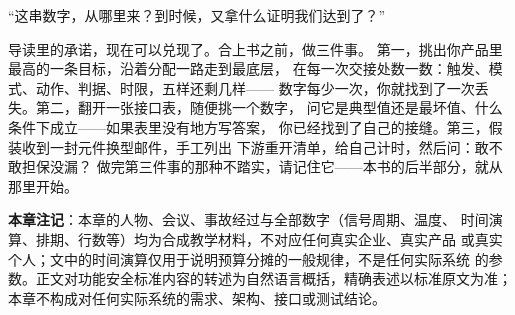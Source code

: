 “这串数字，从哪里来？到时候，又拿什么证明我们达到了？”

导读里的承诺，现在可以兑现了。合上书之前，做三件事。
第一，挑出你产品里最高的一条目标，沿着分配一路走到最底层，
在每一次交接处数一数：触发、模式、动作、判据、时限，五样还剩几样——
数字每少一次，你就找到了一次丢失。第二，翻开一张接口表，随便挑一个数字，
问它是典型值还是最坏值、什么条件下成立——如果表里没有地方写答案，
你已经找到了自己的接缝。第三，假装收到一封元件换型邮件，手工列出
下游重开清单，给自己计时，然后问：敢不敢担保没漏？
做完第三件事的那种不踏实，请记住它——本书的后半部分，就从那里开始。


\begin{noteblock}
\textbf{本章注记}：本章的人物、会议、事故经过与全部数字（信号周期、温度、
时间演算、排期、行数等）均为合成教学材料，不对应任何真实企业、真实产品
或真实个人；文中的时间演算仅用于说明预算分摊的一般规律，不是任何实际系统
的参数。正文对功能安全标准内容的转述为自然语言概括，精确表述以标准原文为准；
本章不构成对任何实际系统的需求、架构、接口或测试结论。
\end{noteblock}
